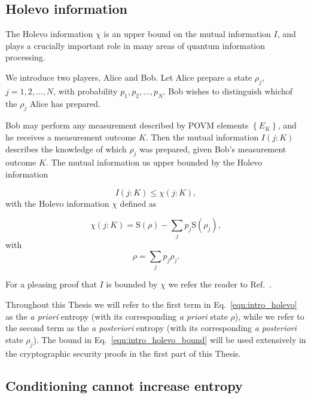 \subsection{Holevo information}
The Holevo information $\chi$ is an upper bound on the mutual information $I$, and plays a crucially important role in many areas of quantum information processing. 

We introduce two players, Alice and Bob. Let Alice prepare a state $\rho_j$, $j = 1, 2, \dots, N$, with probability $p_1, p_2, \dots, p_N$. Bob wishes to distinguish whichof the $\rho_j$ Alice has prepared. 

Bob may perform any measurement described by POVM elements $\left\{E_K\right\}$, and he receives a measurement outcome $K$. Then the mutual information $I\left(j : K\right)$ describes the knowledge of which $\rho_j$ was prepared, given Bob's measurement outcome $K$. The mutual information us upper bounded by the Holevo information

\begin{equation}\label{eqn:intro_holevo_bound}
I\left(j : K \right) \le \chi \left(j : K \right),
\end{equation}
with the Holevo information $\chi$ defined as

\begin{equation}\label{eqn:intro_holevo}
\chi\left(j : K\right)  = \text{S}\left(\rho\right) - \sum_j p_j \text{S}\left(\rho_j\right),
\end{equation}
with
\begin{equation}
\rho = \sum_j p_j \rho_j.
\end{equation}

\noindent For a pleasing proof that $I$ is bounded by $\chi$ we refer the reader to Ref.~\cite{Nielsen2010}. 

Throughout this Thesis we will refer to the first term in Eq.~\ref{eqn:intro_holevo} as the \emph{a priori} entropy (with its corresponding \emph{a priori} state $\rho$), while we refer to the second term as the \emph{a  posteriori} entropy (with its corresponding \emph{a posteriori} state $\rho_j$). The bound in Eq.~\ref{eqn:intro_holevo_bound} will be used extensively in the cryptographic security proofs in the first part of this Thesis.


\FloatBarrier
\subsection{Conditioning cannot increase entropy}

